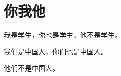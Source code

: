 \documentclass[12pt,UTF-8,openany]{ctexbook}
\begin{document}
\clearpage

\begin{center}
    
    
\end{center}


\hanzibox{}\hanzibox{}\hanzibox{}\hanzibox{}\hspace{1em}\hanzibox{}\hanzibox{}\hanzibox{}\hanzibox{}

\hanzibox{}\hanzibox{}\hanzibox{}\hanzibox{}\hspace{1em}\hanzibox{}\hanzibox{}\hanzibox{}\hanzibox{}

\hanzibox{}\hanzibox{}\hanzibox{}\hanzibox{}\hspace{1em}\hanzibox{}\hanzibox{}\hanzibox{}\hanzibox{}

\hanzibox{}\hanzibox{}\hanzibox{}\hanzibox{}\hspace{1em}\hanzibox{}\hanzibox{}\hanzibox{}\hanzibox{}






\chapter{你我他}

\begin{large}
    
    我是学生，你也是学生，他不是学生。
    
    我们是中国人，你们也是中国人。
    
    他们不是中国人。
    
\end{large}


\clearpage

\begin{center}
    
\end{center}


\hanzibox{}\hanzibox{}\hanzibox{}\hanzibox{}\hspace{1em}\hanzibox{}\hanzibox{}\hanzibox{}\hanzibox{}
\end{document}
